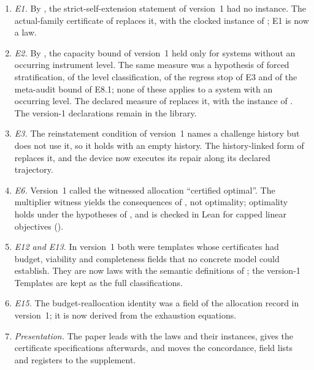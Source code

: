\begin{enumerate}
  \item \emph{E1.} By , the strict-self-extension statement of version~1
    had no instance. The actual-family certificate of  replaces it, with the
    clocked instance of ; E1 is now a law.
  \item \emph{E2.} By , the capacity bound of version~1 held only for
    systems without an occurring instrument level. The same measure was a hypothesis of forced
    stratification, of the level classification, of the regress stop of E3 and of the meta-audit bound
    of E8.1; none of these applies to a system with an occurring level. The declared measure of
     replaces it, with the instance of . The version-1
    declarations remain in the library.
  \item \emph{E3.} The reinstatement condition of version~1 names a challenge history but does not
    use it, so it holds with an empty history. The history-linked form of 
    replaces it, and the device now executes its repair along its declared trajectory.
  \item \emph{E6.} Version~1 called the witnessed allocation ``certified optimal''. The multiplier
    witness yields the consequences of , not optimality; optimality holds under the
    hypotheses of , and is checked in Lean for capped linear objectives
    ().
  \item \emph{E12 and E13.} In version~1 both were templates whose certificates had budget,
    viability and completeness fields that no concrete model could establish. They are now laws with
    the semantic definitions of ; the version-1 Templates are
    kept as the full classifications.
  \item \emph{E15.} The budget-reallocation identity was a field of the allocation record in
    version~1; it is now derived from the exhaustion equations.
  \item \emph{Presentation.} The paper leads with the laws and their instances, gives the
    certificate specifications afterwards, and moves the concordance, field lists and registers to
    the supplement.
\end{enumerate}
